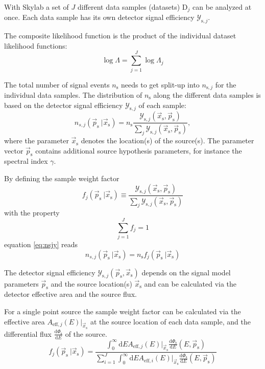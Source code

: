 \documentclass{article}
\newcommand{\ns}{n_{\mathrm{s}}}
\newcommand{\ps}{\vec{p}_{\mathrm{s}}}
\newcommand{\xs}{\vec{x}_{\mathrm{s}}}
\newcommand{\dPhisdE}{\frac{\mathrm{d}\Phi_{\mathrm{s}}}{\mathrm{d}E}}
\begin{document}
With Skylab a set of $J$ different data samples (datasets) $\mathrm{D}_j$ can be
analyzed at once. Each data sample has its own detector signal efficiency
$\mathcal{Y}_{\mathrm{s},j}$.

The composite likelihood function is the product of the individual dataset
likelihood functions:
\begin{equation}
 \log \Lambda = \sum_{j=1}^{J} \log \Lambda_j
 \label{eq:logLambdaComposite}
\end{equation}

The total number of signal events $\ns$ needs to get split-up into
$n_{\mathrm{s},j}$ for the individual data samples. The distribution of $\ns$
along the different data samples is based on the detector signal efficiency
$\mathcal{Y}_{\mathrm{s},j}$ of each sample:
\begin{equation}
 n_{s,j}(\ps~|\vec{x}_{\mathrm{s}}) = \ns \frac{\mathcal{Y}_{\mathrm{s},j}(\vec{x}_{\mathrm{s}},\ps)}{\sum_j \mathcal{Y}_{\mathrm{s},j}(\vec{x}_{\mathrm{s}},\ps)},
 \label{eq:nsjy}
\end{equation}
where the parameter $\vec{x}_{\mathrm{s}}$ denotes the location(s) of the source(s).
The parameter vector $\ps$ contains additional source hypothesis parameters,
for instance the spectral index $\gamma$.

By defining the sample weight factor
\begin{equation}
 f_j(\ps~|\vec{x}_{\mathrm{s}}) \equiv \frac{\mathcal{Y}_{\mathrm{s},j}(\vec{x}_{\mathrm{s}},\ps)}{\sum_j \mathcal{Y}_{\mathrm{s},j}(\vec{x}_{\mathrm{s}},\ps)}
\end{equation}
with the property
\begin{equation}
 \sum_{j=1}^{J} f_j = 1
\end{equation}
equation \ref{eq:nsjy} reads
\begin{equation}
 n_{s,j}(\ps~|\vec{x}_{\mathrm{s}}) = \ns f_{j}(\ps~|\vec{x}_{\mathrm{s}})
 \label{eq:ns-sample-weight-factor}
\end{equation}

The detector signal efficiency $\mathcal{Y}_{\mathrm{s},j}(\ps,\xs)$
depends on the signal model parameters $\ps$ and the source location(s) $\xs$
and can be calculated via the detector effective area and the source flux.

For a single point source the sample weight factor can be calculated via the effective area
$A_{\mathrm{eff},j}(E)|_{\xs}$ at the source location of each data sample, and the
differential flux $\dPhisdE$ of the source.
\begin{equation}
 f_{j}(\ps~|\xs) = \frac{\int_0^\infty \mathrm{d}E A_{\mathrm{eff},j}(E)|_{\xs} \dPhisdE(E,\ps)}
		        {\sum_{i=1}^{J} \int_0^\infty \mathrm{d}E A_{\mathrm{eff},i}(E)|_{\xs} \dPhisdE(E,\ps)}
 \label{eq:fj}
\end{equation}
\end{document}
